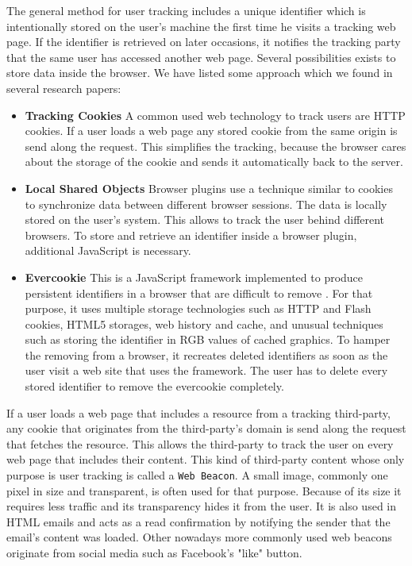 	The general method for user tracking includes a unique identifier which is intentionally stored on the user's machine the first time he visits a tracking web page. If the identifier is retrieved on later occasions, it notifies the tracking party that the same user has accessed another web page. Several possibilities exists to store data inside the browser. We have listed some approach which we found in several research papers:
		
	\begin{itemize}
		\item \textbf{Tracking Cookies} A common used web technology to track users are HTTP cookies. If a user loads a web page any stored cookie from the same origin is send along the request. This simplifies the tracking, because the browser cares about the storage of the cookie and sends it automatically back to the server.
		
		\item \textbf{Local Shared Objects} Browser plugins use a technique similar to cookies to synchronize data between different browser sessions. The data is locally stored on the user's system. This allows to track the user behind different browsers. To store and retrieve an identifier inside a browser plugin, additional JavaScript is necessary.
		
		\item \textbf{Evercookie} This is a JavaScript framework implemented to produce persistent identifiers in a browser that are difficult to remove \cite{evercookie}. For that purpose, it uses multiple storage technologies such as HTTP and Flash cookies, HTML5 storages, web history and cache, and unusual techniques such as storing the identifier in RGB values of cached graphics. To hamper the removing from a browser, it recreates deleted identifiers as soon as the user visit a web site that uses the framework. The user has to delete every stored identifier to remove the evercookie completely. 
	\end{itemize}
	
	If a user loads a web page that includes a resource from a tracking third-party, any cookie that originates from the third-party's domain is send along the request that fetches the resource. This allows the third-party to track the user on every web page that includes their content. This kind of third-party content whose only purpose is user tracking is called a \texttt{Web Beacon}. A small image, commonly one pixel in size and transparent, is often used for that purpose. Because of its size it requires less traffic and its transparency hides it from the user. It is also used in HTML emails and acts as a read confirmation by notifying the sender that the email's content was loaded. Other nowadays more commonly used web beacons originate from social media such as Facebook's "like" button. 

